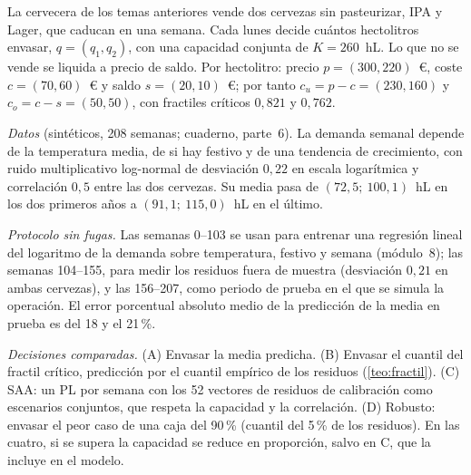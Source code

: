 \begin{ejemplo}\label{ej:fresca}
La cervecera de los temas anteriores vende dos cervezas sin pasteurizar, IPA y Lager, que caducan en una semana. Cada lunes decide cuántos hectolitros envasar, $q=(q_1,q_2)$, con una capacidad conjunta de $K=260$~hL. Lo que no se vende se liquida a precio de saldo. Por hectolitro: precio $p=(300,220)$~€, coste $c=(70,60)$~€ y saldo $s=(20,10)$~€; por tanto $c_u=p-c=(230,160)$ y $c_o=c-s=(50,50)$, con fractiles críticos $0{,}821$ y $0{,}762$.

\emph{Datos} (sintéticos, 208 semanas; cuaderno, parte~6). La demanda semanal depende de la temperatura media, de si hay festivo y de una tendencia de crecimiento, con ruido multiplicativo log-normal de desviación $0{,}22$ en escala logarítmica y correlación $0{,}5$ entre las dos cervezas. Su media pasa de $(72{,}5;\ 100{,}1)$~hL en los dos primeros años a $(91{,}1;\ 115{,}0)$~hL en el último.

\emph{Protocolo sin fugas.} Las semanas 0--103 se usan para entrenar una regresión lineal del logaritmo de la demanda sobre temperatura, festivo y semana (módulo~8); las semanas 104--155, para medir los residuos fuera de muestra (desviación $0{,}21$ en ambas cervezas), y las 156--207, como periodo de prueba en el que se simula la operación. El error porcentual absoluto medio de la predicción de la media en prueba es del 18 y el 21\,\%.

\emph{Decisiones comparadas.} (A) Envasar la media predicha. (B) Envasar el cuantil del fractil crítico, predicción por el cuantil empírico de los residuos (\cref{teo:fractil}). (C) SAA: un PL por semana con los 52 vectores de residuos de calibración como escenarios conjuntos, que respeta la capacidad y la correlación. (D) Robusto: envasar el peor caso de una caja del 90\,\% (cuantil del 5\,\% de los residuos). En las cuatro, si se supera la capacidad se reduce en proporción, salvo en C, que la incluye en el modelo.


\end{ejemplo}
